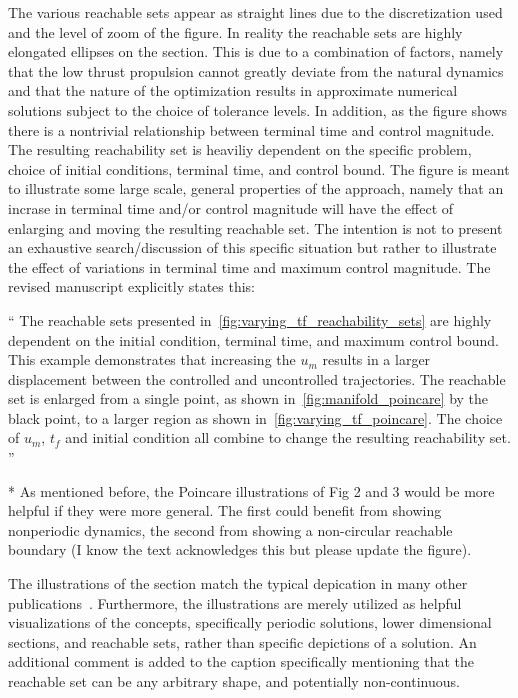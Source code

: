 \documentclass[11pt]{article}
\newenvironment{correction}{\begin{list}{}{\setlength{\leftmargin}{1cm}\setlength{\rightmargin}{1cm}}\vspace{\parsep}\item[]``}{''\end{list}}
\begin{document}
\begin{itemize}
        The various reachable sets appear as straight lines due to the discretization used and the level of zoom of the figure.
        In reality the reachable sets are highly elongated ellipses on the \Poincare section.
        This is due to a combination of factors, namely that the low thrust propulsion cannot greatly deviate from the natural dynamics and that the nature of the optimization results in approximate numerical solutions subject to the choice of tolerance levels.
        In addition, as the figure shows there is a nontrivial relationship between terminal time and control magnitude. 
        The resulting reachability set is heaviliy dependent on the specific problem, choice of initial conditions, terminal time, and control bound.
        The figure is meant to illustrate some large scale, general properties of the approach, namely that an incrase in terminal time and/or control magnitude will have the effect of enlarging and moving the resulting reachable set.
     The intention is not to present an exhaustive search/discussion of this specific situation but rather to illustrate the effect of variations in terminal time and maximum control magnitude.
        The revised manuscript explicitly states this:
        \begin{correction}
            The reachable sets presented in~\cref{fig:varying_tf_reachability_sets} are highly dependent on the initial condition, terminal time, and maximum control bound. 
            This example demonstrates that increasing the \( u_m \) results in a larger displacement between the controlled and uncontrolled trajectories.
            The reachable set is enlarged from a single point, as shown in~\cref{fig:manifold_poincare} by the black point, to a larger region as shown in~\cref{fig:varying_tf_poincare}.
            The choice of \( u_m\), \( t_f \) and initial condition all combine to change the resulting reachability set. 
        \end{correction}
    \item
        \begin{itshape}

            * As mentioned before, the Poincare illustrations of Fig 2 and 3 would be
            more helpful if they were more general.  The first could benefit from
            showing nonperiodic dynamics, the second from showing a non-circular
            reachable boundary (I know the text acknowledges this but please update the
            figure).  
        \end{itshape}
        The illustrations of the \Poincare section match the typical depication in many other publications~\cite{koon2001}.
        Furthermore, the illustrations are merely utilized as helpful visualizations of the concepts, specifically periodic solutions, lower dimensional \Poincare sections, and reachable sets, rather than specific depictions of a solution.
        An additional comment is added to the caption specifically mentioning that the reachable set can be any arbitrary shape, and potentially non-continuous.


\end{itemize}
\end{document}
